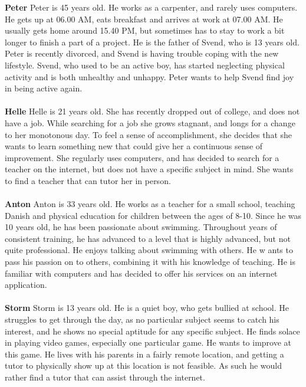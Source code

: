 \textbf{Peter}
Peter is 45 years old.
He works as a carpenter, and rarely uses computers.
He gets up at 06.00 AM, eats breakfast and arrives at work at 07.00 AM.
He usually gets home around 15.40 PM, but sometimes has to stay to work a bit longer to finish a part of a project.
He is the father of Svend, who is 13 years old.
Peter is recently divorced, and Svend is having trouble coping with the new lifestyle.
Svend, who used to be an active boy, has started neglecting physical activity and is both unhealthy and unhappy.
Peter wants to help Svend find joy in being active again. 
\\\\
\textbf{Helle}
Helle is 21 years old.
She has recently dropped out of college, and does not have a job.
While searching for a job she grows stagnant, and longs for a change to her monotonous day.
To feel a sense of accomplishment, she decides that she wants to learn something new that could give her a continuous sense of improvement.
She regularly uses computers, and has decided to search for a teacher on the internet, but does not have a specific subject in mind.
She wants to find a teacher that can tutor her in person.
\\\\
\textbf{Anton}
Anton is 33 years old.
He works as a teacher for a small school, teaching Danish and physical education for children between the ages of 8-10.
Since he was 10 years old, he has been passionate about swimming.
Throughout years of consistent training, he has advanced to a level that is highly advanced, but not quite professional.
He enjoys talking about swimming with others. He w
ants to pass his passion on to others, combining it with his knowledge of teaching.
He is familiar with computers and has decided to offer his services on an internet application.
\\\\
\textbf{Storm}
Storm is 13 years old. He is a quiet boy, who gets bullied at school. 
He struggles to get through the day, as no particular subject seems to catch his interest, and he shows no special aptitude for any specific subject.
He finds solace in playing video games, especially one particular game. 
He wants to improve at this game.
He lives with his parents in a fairly remote location, and getting a tutor to physically show up at this location is not feasible.
As such he would rather find a tutor that can assist through the internet.
